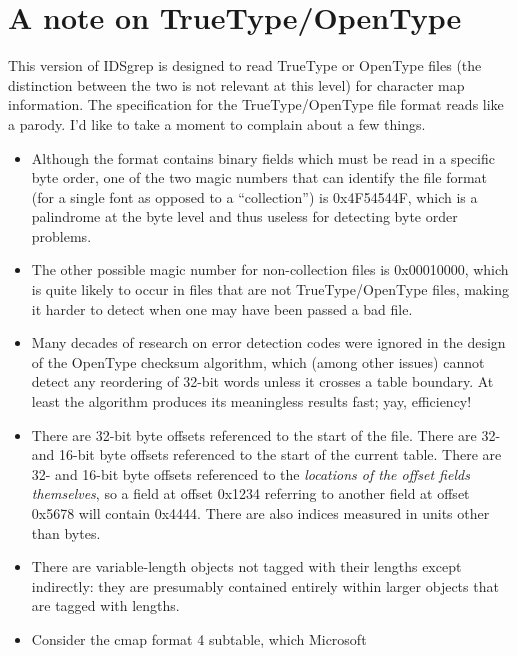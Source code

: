\documentclass[twocolumn]{report}
\newcommand{\DangerousSection}{\marginpar{\large\hfill
\raisebox{-0.5\baselineskip}[0pt][0pt]{\dbend}\hfill\null}}
\begin{document}

\break\vspace*{-1.82\baselineskip}%
\section{A note on TrueType/OpenType}\DangerousSection

This version of IDSgrep is designed to read TrueType or
OpenType files (the distinction between the two is not relevant at this
level) for character map information.  The specification for the
TrueType/OpenType file format reads like a parody.  I'd like to take a
moment to complain about a few things.

\begin{itemize}
  \item Although the format contains binary fields which must be read
    in a specific byte order, one of the two magic numbers that can
    identify the file format (for a single font as opposed to a
    ``collection'') is 0x4F54544F, which is a palindrome at the byte
    level and thus useless for detecting byte order problems.
  \item The other possible magic number for non-collection files
    is 0x00010000, which is quite likely to occur in files that are
    not TrueType/OpenType files, making it harder to detect when one
    may have been passed a bad file.
  \item Many decades of research on error detection codes were ignored
    in the design of the OpenType checksum algorithm, which (among
    other issues) cannot detect any reordering of 32-bit words unless
    it crosses a table boundary.  At least the algorithm produces its
    meaningless results fast; yay, efficiency!
  \item There are 32-bit byte offsets referenced to the start of the file.
    There are 32- and 16-bit byte offsets referenced to the start of
    the current table.  There are 32- and 16-bit byte offsets
    referenced to the \emph{locations of the offset fields themselves}, so a
    field at offset 0x1234 referring to another field at offset 0x5678
    will contain 0x4444.  There are also indices measured in units
    other than bytes.
  \item There are variable-length objects not tagged
    with their lengths except indirectly: they are presumably
    contained entirely within larger objects that are tagged with lengths.
  \item Consider the cmap format 4 subtable, which Microsoft

\end{itemize}
\end{document}
